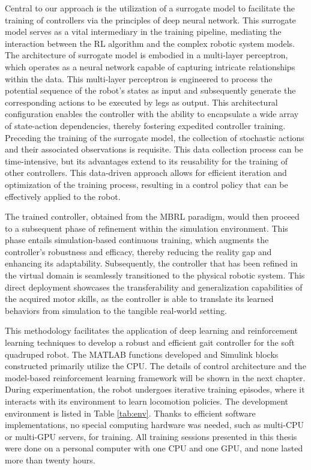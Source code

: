 Central to our approach is the utilization of a surrogate model to facilitate the training of controllers via the principles of deep neural network. This surrogate model serves as a vital intermediary in the training pipeline, mediating the interaction between the RL algorithm and the complex robotic system models. The architecture of surrogate model is embodied in a multi-layer perceptron, which operates as a neural network capable of capturing intricate relationships within the data. This multi-layer perceptron is engineered to process the potential sequence of the robot's states as input and subsequently generate the corresponding actions to be executed by legs as output. This architectural configuration enables the controller with the ability to encapsulate a wide array of state-action dependencies, thereby fostering expedited controller training. Preceding the training of the surrogate model, the collection of stochastic actions and their associated observations is requisite. This data collection process can be time-intensive, but its advantages extend to its reusability for the training of other controllers. This data-driven approach allows for efficient iteration and optimization of the training process, resulting in a control policy that can be effectively applied to the robot.

The trained controller, obtained from the \ac{MBRL} paradigm, would then proceed to a subsequent phase of refinement within the simulation environment. This phase entails simulation-based continuous training, which augments the controller's robustness and efficacy, thereby reducing the reality gap and enhancing its adaptability. Subsequently, the controller that has been refined in the virtual domain is seamlessly transitioned to the physical robotic system. This direct deployment showcases the transferability and generalization capabilities of the acquired motor skills, as the controller is able to translate its learned behaviors from simulation to the tangible real-world setting.

This methodology facilitates the application of deep learning and reinforcement learning techniques to develop a robust and efficient gait controller for the soft quadruped robot. The MATLAB functions developed and Simulink blocks constructed primarily utilize the CPU. The details of control architecture and the model-based reinforcement learning framework will be shown in the next chapter. During experimentation, the robot undergoes iterative training episodes, where it interacts with its environment to learn locomotion policies. The development environment is listed in Table \ref{tab:env}. Thanks to efficient software implementations, no special computing hardware was needed, such as multi-CPU or multi-GPU servers, for training. All training sessions presented in this thesis were done on a personal computer with one CPU and one GPU, and none lasted more than twenty hours.


